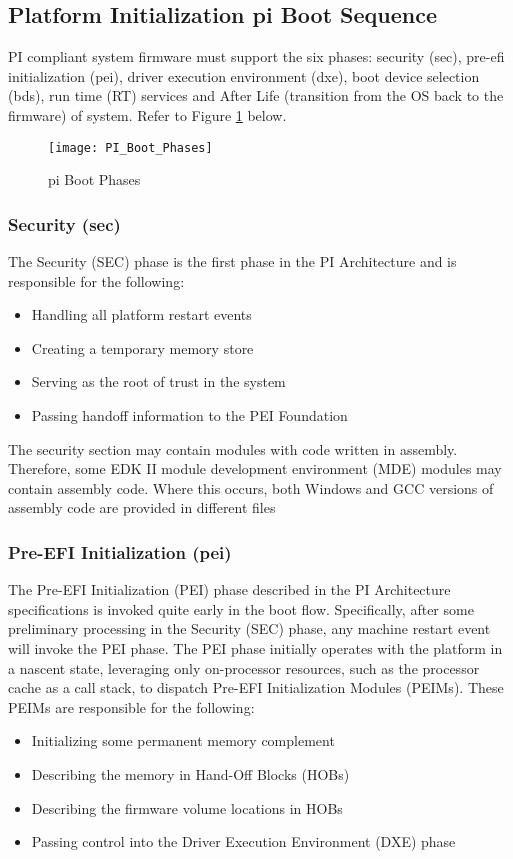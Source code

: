 \subsection{Platform Initialization \gls{pi} Boot Sequence}
PI compliant system firmware must support the six phases: security (\gls{sec}), pre-efi initialization (\gls{pei}), driver execution environment (\gls{dxe}), boot device selection (\gls{bds}), run time (RT) services and After Life (transition from the OS back to the firmware) of system. Refer to Figure \ref{fig:design-pi-boot-phases} below.

\begin{figure}[h]
	\texttt{[image: PI\_Boot\_Phases]}
	\caption{\gls{pi} Boot Phases}\label{fig:design-pi-boot-phases}
\end{figure}

\subsubsection{Security (\gls{sec})}
The Security (SEC) phase is the first phase in the PI Architecture and is responsible for the following:
\begin{itemize}
	\item Handling all platform restart events
	\item Creating a temporary memory store
	\item Serving as the root of trust in the system
	\item Passing handoff information to the PEI Foundation
\end{itemize}
The security section may contain modules with code written in assembly. Therefore, some EDK II module development environment (MDE) modules may contain assembly code. Where this occurs, both Windows and GCC versions of assembly code are provided in different files

\subsubsection{Pre-EFI Initialization (\gls{pei})}
The Pre-EFI Initialization (PEI) phase described in the PI Architecture specifications is invoked quite early in the boot flow. Specifically, after some preliminary processing in the Security (SEC) phase, any machine restart event will invoke the PEI phase.
The PEI phase initially operates with the platform in a nascent state, leveraging only on-processor resources, such as the processor cache as a call stack, to dispatch Pre-EFI Initialization Modules (PEIMs). These PEIMs are responsible for the following:
\begin{itemize}
	\item Initializing some permanent memory complement
	\item Describing the memory in Hand-Off Blocks (HOBs)
	\item Describing the firmware volume locations in HOBs
	\item Passing control into the Driver Execution Environment (DXE) phase
\end{itemize}

